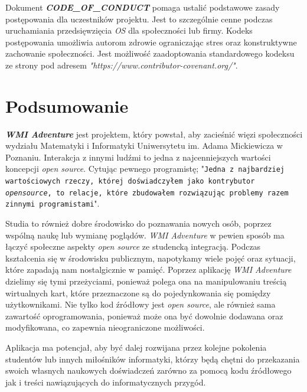 \documentclass{article}
\begin{document}
\hspace{4mm} Dokument \textbf{\emph{CODE\_OF\_CONDUCT}} pomaga ustalić podstawowe zasady postępowania dla uczestników projektu. Jest to szczególnie cenne podczas uruchamiania przedsięwzięcia \emph{OS} dla społeczności lub firmy. Kodeks postępowania umożliwia autorom zdrowie ograniczając stres oraz konstruktywne zachowanie społeczności\cite{opensource.guide}. Jest możliwość zaadoptowania standardowego kodeksu ze strony pod adresem \emph{"https://www.contributor-covenant.org/"}\cite{contributor.covenant}.

\section{Podsumowanie}

\hspace{4mm} \textbf{\emph{WMI Adventure}} jest projektem, który powstał, aby zacieśnić więzi społeczności wydziału Matematyki i Informatyki Uniwersytetu im. Adama Mickiewicza w Poznaniu. Interakcja z innymi ludźmi to jedna z najcenniejszych wartości koncepcji \emph{open source}. Cytując pewnego programistę; "\texttt{Jedna z najbardziej wartościowych rzeczy, której doświadczyłem jako kontrybutor \emph{open\newline source}, to relacje, które zbudowałem rozwiązując problemy razem z\newline innymi programistami}"\cite{kentcdodds}. 

Studia to również dobre środowisko do poznawania nowych osób, poprzez wspólną naukę lub wymianę poglądów. \emph{WMI Adventure} w pewien sposób ma łączyć społeczne aspekty \emph{open source} ze studencką integracją. Podczas kształcenia się w środowisku publicznym, napotykamy wiele pojęć oraz sytuacji, które zapadają nam nostalgicznie w pamięć. Poprzez aplikację \emph{WMI Adventure} dzielimy się tymi przeżyciami, ponieważ polega ona na manipulowaniu treścią wirtualnych kart, które przeznaczone są do pojedynkowania się pomiędzy użytkownikami. Nie tylko kod źródłowy jest \emph{open source}, ale również sama zawartość oprogramowania, ponieważ może ona być dowolnie dodawana oraz modyfikowana, co zapewnia nieograniczone możliwości.

Aplikacja ma potencjał, aby być dalej rozwijana przez kolejne pokolenia studentów lub innych miłośników informatyki, którzy będą chętni do przekazania swoich własnych naukowych doświadczeń zarówno za pomocą kodu źródłowego jak i treści nawiązujących do informatycznych przygód.
\end{document}
